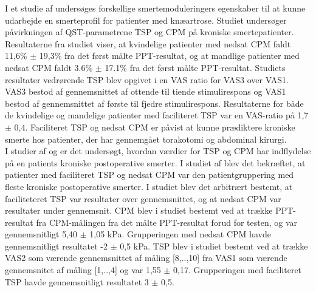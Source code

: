 I et studie af  undersøges forskellige smertemoduleringers egenskaber til at kunne udarbejde en smerteprofil for patienter med knæartrose. Studiet undersøger påvirkningen af QST-parametrene TSP og CPM på kroniske smertepatienter. Resultaterne fra studiet viser, at kvindelige patienter med nedsat CPM faldt 11,6\% $\pm$ 19,3\% fra det først målte PPT-resultat, og at mandlige patienter med nedsat CPM faldt 3.6\% $\pm$ 17.1\% fra det først målte PPT-resultat. Studiets resultater vedrørende TSP blev opgivet i en VAS ratio for VAS3 over VAS1. VAS3 bestod af gennemsnittet af ottende til tiende stimulirespons og VAS1 bestod af gennemsnittet af første til fjedre stimulirespons. Resultaterne for både de kvindelige og mandelige patienter med faciliteret TSP var en VAS-ratio på 1,7 $\pm$ 0,4. Faciliteret TSP og nedsat CPM er påvist at kunne prædiktere kroniske smerte hos patienter, der har gennemgået torakotomi og abdominal kirurgi. \citep{Vaegter2016} \\
I studier af  og  er det undersøgt, hvordan værdier for TSP og CPM har indflydelse på en patients kroniske postoperative smerter. I studiet af  blev det bekræftet, at patienter med faciliteret TSP og nedsat CPM var den patientgruppering med fleste kroniske postoperative smerter. I studiet blev det arbitrært bestemt, at faciliteteret TSP var resultater over gennemsnittet, og at nedsat CPM var resultater under gennemsnit. CPM blev i studiet bestemt ved at trække PPT-resultat fra CPM-målingen fra det målte PPT-resultat forud for testen, og var gennemsnitligt 5,40 $\pm$ 1,05 kPa. Grupperingen med nedsat CPM havde gennemsnitligt resultatet -2 $\pm$ 0,5 kPa. TSP blev i studiet bestemt ved at trække VAS2 som værende gennemsnittet af måling [8,..,10] fra VAS1 som værende gennemsnitet af måling [1,..,4] og var 1,55 $\pm$ 0,17. Grupperingen med faciliteret TSP havde gennemsnitligt resultatet 3 $\pm$ 0,5. 

\begin{table}[H]
	\centering
	\caption{I tabellen ses resultaterne vedrørende CPM og TSP målinger på gruppering med nedsat CPM og faciliteret TSP.}
	\label{tab:CPM_TSP}
\end{table}

